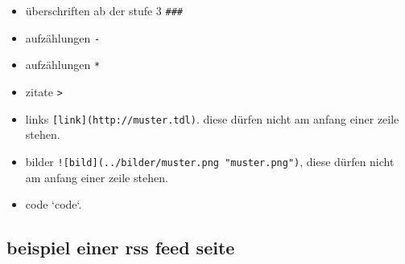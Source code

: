 \begin{itemize}
\itemsep1pt\parskip0pt
\item
  überschriften ab der stufe 3 \texttt{\#\#\#}
\item
  aufzählungen \texttt{-}
\item
  aufzählungen \texttt{*}
\item
  zitate \texttt{\textgreater{}}
\item
  links \texttt{{[}link{]}(http://muster.tdl)}. diese dürfen nicht am
  anfang einer zeile stehen.
\item
  bilder \texttt{!{[}bild{]}(../bilder/muster.png "muster.png")}, diese
  dürfen nicht am anfang einer zeile stehen.
\item
  code `code`.
\end{itemize}

\subsection{beispiel einer rss feed
seite}\label{beispiel-einer-rss-feed-seite}

% 
% 
% 
% 
% 

